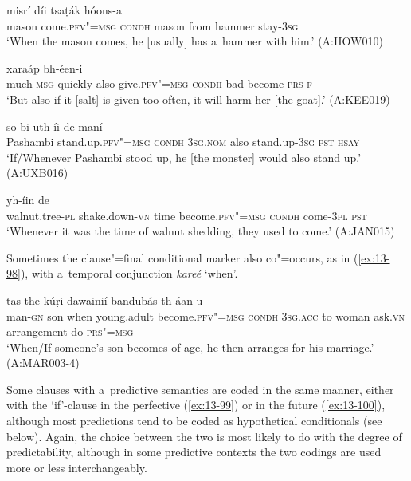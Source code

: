 \begin{exe}
\ex
\label{ex:13-94}
 misrí díi tsaṭák hóons-a \\
mason come.\textsc{pfv"=msg} \textsc{condh} mason from hammer stay-\textsc{3sg}  \\
\glt `When the mason comes, he [usually] has a~hammer with him.' (A:HOW010)

\ex
\label{ex:13-95}
 xaraáp  bh-éen-i \\
much-\textsc{msg} quickly also give.\textsc{pfv"=msg} \textsc{condh} bad  become-\textsc{prs-f}   \\
\glt `But also if it [salt] is given too often, it will harm her [the goat].' (A:KEE019)

\ex
\label{ex:13-96}
 so bi  uth-íi de maní \\
Pashambi stand.up.\textsc{pfv"=msg} \textsc{condh} \textsc{3sg.nom} also stand.up-\textsc{3sg} \textsc{pst} \textsc{hsay}  \\
\glt `If/Whenever Pashambi stood up, he [the monster] would also stand up.' (A:UXB016)

\ex
\label{ex:13-97}
\gll [ac̣húuṛi-m ṭhak"=ainií waxt bhíl-u seentá]  yh-íin de \\
walnut.tree-\textsc{pl} shake.down-\textsc{vn} time become.\textsc{pfv"=msg} \textsc{condh} come-\textsc{3pl} \textsc{ pst}    \\
\glt `Whenever it was the time of walnut shedding, they used to come.' (A:JAN015) 
\end{exe}

Sometimes the clause"=final conditional marker also co"=occurs, as in (\ref{ex:13-98}), with a~temporal conjunction \textit{kareé} `when'. 

\begin{exe}
\ex
\label{ex:13-98}
  tas the kúṛi dawainií
bandubás  th-áan-u \\
man-\textsc{gn} son when young.adult become.\textsc{pfv"=msg} \textsc{condh} \textsc{3sg.acc} to woman ask.\textsc{vn} arrangement do-\textsc{prs"=msg}  \\
\glt `When/If someone's son becomes of age, he then arranges for his marriage.' (A:MAR003-4) 
\end{exe}

Some clauses with a~predictive semantics are coded in the same manner, either with the `if'-clause in the perfective (\ref{ex:13-99}) or in the future (\ref{ex:13-100}), although most predictions tend to be coded as hypothetical conditionals (see below). Again, the choice between the two is most likely to do with the degree of predictability, although in some predictive contexts the two codings are used more or less interchangeably.

